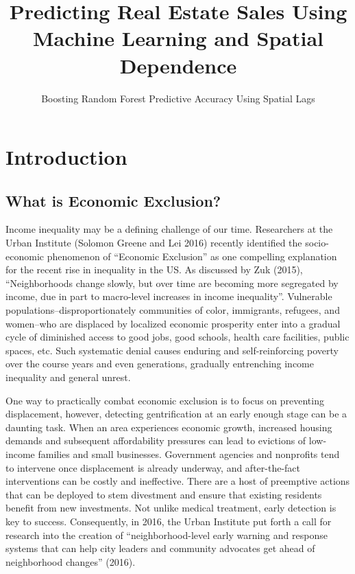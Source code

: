 \documentclass[]{article}
\title{Predicting Real Estate Sales Using Machine Learning and Spatial
Dependence}
\subtitle{Boosting Random Forest Predictive Accuracy Using Spatial Lags}
\author{}
\date{}
\begin{document}
\maketitle

{
\setcounter{tocdepth}{2}
\tableofcontents
}
\section{Introduction}\label{introduction}

\subsection{What is Economic
Exclusion?}\label{what-is-economic-exclusion}

Income inequality may be a defining challenge of our time. Researchers
at the Urban Institute (Solomon Greene and Lei 2016) recently identified
the socio-economic phenomenon of ``Economic Exclusion'' as one
compelling explanation for the recent rise in inequality in the US. As
discussed by Zuk (2015), ``Neighborhoods change slowly, but over time
are becoming more segregated by income, due in part to macro-level
increases in income inequality''. Vulnerable
populations--disproportionately communities of color, immigrants,
refugees, and women--who are displaced by localized economic prosperity
enter into a gradual cycle of diminished access to good jobs, good
schools, health care facilities, public spaces, etc. Such systematic
denial causes enduring and self-reinforcing poverty over the course
years and even generations, gradually entrenching income inequality and
general unrest.

One way to practically combat economic exclusion is to focus on
preventing displacement, however, detecting gentrification at an early
enough stage can be a daunting task. When an area experiences economic
growth, increased housing demands and subsequent affordability pressures
can lead to evictions of low-income families and small businesses.
Government agencies and nonprofits tend to intervene once displacement
is already underway, and after-the-fact interventions can be costly and
ineffective. There are a host of preemptive actions that can be deployed
to stem divestment and ensure that existing residents benefit from new
investments. Not unlike medical treatment, early detection is key to
success. Consequently, in 2016, the Urban Institute put forth a call for
research into the creation of ``neighborhood-level early warning and
response systems that can help city leaders and community advocates get
ahead of neighborhood changes'' (2016).
\end{document}
